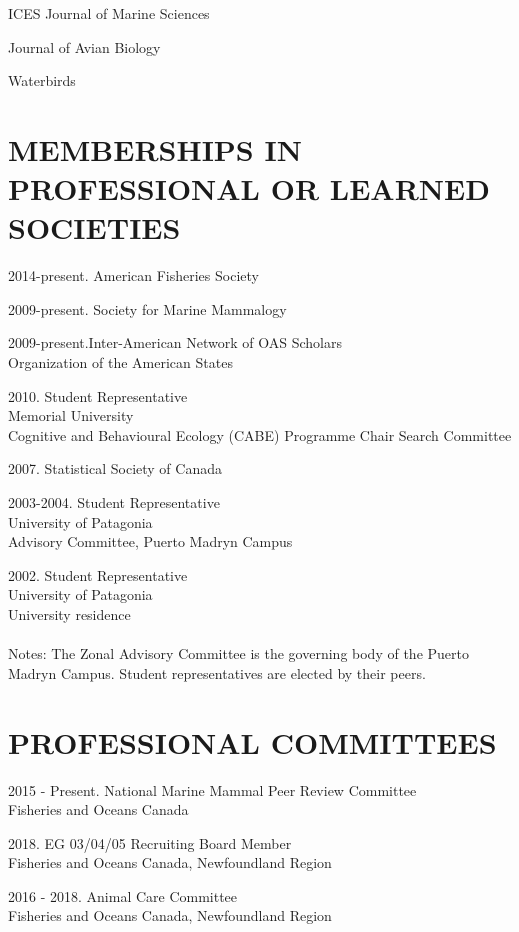 \documentclass{res}
\begin{document}
\begin{resume}
ICES Journal of Marine Sciences

Journal of Avian Biology

Waterbirds

\section{MEMBERSHIPS IN PROFESSIONAL OR LEARNED SOCIETIES}
\vspace{0.2in}
\begin{hangparas}{.4in}{1}
2014-present. American Fisheries Society

2009-present. Society for Marine Mammalogy    

2009-present.Inter-American Network of OAS Scholars     \\
Organization of the American States

2010. Student Representative\\
Memorial University\\
Cognitive and Behavioural Ecology (CABE) Programme Chair Search Committee

2007. Statistical Society of Canada

2003-2004. Student Representative\\
University of Patagonia\\
Advisory Committee, Puerto Madryn Campus

2002. Student Representative\\
University of Patagonia\\
University residence\\~\\
Notes: The Zonal Advisory Committee is the governing body of the Puerto Madryn Campus. 
Student representatives are elected by their peers.

\end{hangparas}
\section{PROFESSIONAL COMMITTEES}
\vspace{0.2in}
\begin{hangparas}{.4in}{1}
2015 - Present. National Marine Mammal Peer Review Committee\\
Fisheries and Oceans Canada

2018. EG 03/04/05 Recruiting Board Member\\
Fisheries and Oceans Canada, Newfoundland Region

2016 - 2018. Animal Care Committee\\
Fisheries and Oceans Canada, Newfoundland Region



\end{hangparas}
\end{resume}
\end{document}
